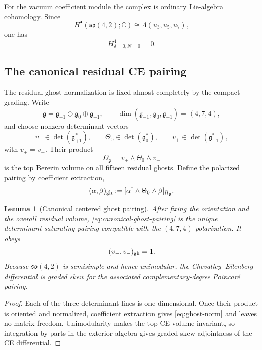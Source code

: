 \documentclass[11pt]{article}
\newtheorem{lemma}[theorem]{Lemma}
\theoremstyle{definition}
\theoremstyle{remark}
\newcommand{\C}{\mathbb C}
\newcommand{\g}{\mathfrak g}
\begin{document}
For the vacuum coefficient module the complex is ordinary Lie-algebra
cohomology.  Since
\begin{equation}
 H^\bullet(\mathfrak{so}(4,2);\C)
 \cong\Lambda(u_3,u_5,u_7),
\end{equation}
one has
\begin{equation}\label{eq:vacuum-zero}
 H^4_{\delta=0,N=0}=0.
\end{equation}

\subsection{The canonical residual CE pairing}

The residual ghost normalization is fixed almost completely by the compact
grading.  Write
\begin{equation}
 \g=\g_{-1}\oplus\g_0\oplus\g_{+1},
 \qquad \dim(\g_{-1},\g_0,\g_{+1})=(4,7,4),
\end{equation}
and choose nonzero determinant vectors
\begin{equation}
 v_-\in\det(\g_{+1}^*),
 \qquad
 \Theta_0\in\det(\g_0^*),
 \qquad
 v_+\in\det(\g_{-1}^*),
\end{equation}
with $v_+=v_-^\dagger$.  Their product
\begin{equation}
 \Omega_\g=v_+\wedge\Theta_0\wedge v_-
\end{equation}
is the top Berezin volume on all fifteen residual ghosts.  Define the
polarized pairing by coefficient extraction,
\begin{equation}\label{eq:canonical-ghost-pairing}
 (\alpha,\beta)_{\rm gh}
 :=[\alpha^\dagger\wedge\Theta_0\wedge\beta]_{\Omega_\g}.
\end{equation}

\begin{lemma}[Canonical centered ghost pairing]\label{lem:ghost-pairing}
After fixing the orientation and the overall residual volume,
\eqref{eq:canonical-ghost-pairing} is the unique determinant-saturating
pairing compatible with the $(4,7,4)$ polarization.  It obeys
\begin{equation}\label{eq:ghost-norm}
 (v_-,v_-)_{\rm gh}=1.
\end{equation}
Because $\mathfrak{so}(4,2)$ is semisimple and hence unimodular, the
Chevalley--Eilenberg differential is graded skew for the associated
complementary-degree Poincar\'e pairing.
\end{lemma}

\begin{proof}
Each of the three determinant lines is one-dimensional.  Once their product
is oriented and normalized, coefficient extraction gives
\eqref{eq:ghost-norm} and leaves no matrix freedom.  Unimodularity makes the
top CE volume invariant, so integration by parts in the exterior algebra
gives graded skew-adjointness of the CE differential.
\end{proof}
\end{document}
